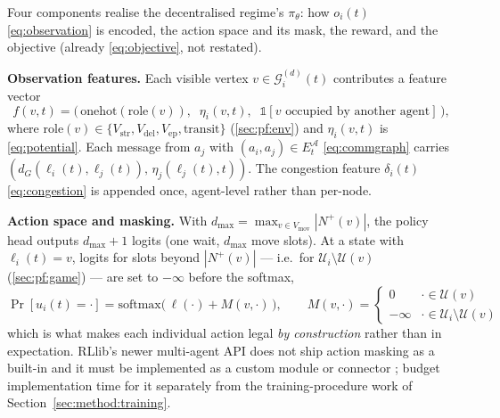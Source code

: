 \documentclass[../main.tex]{subfiles}
\begin{document}
Four components realise the decentralised regime's $\pi_\theta$: how
$o_i(t)$ \eqref{eq:observation} is encoded, the action space and its mask,
the reward, and the objective (already \eqref{eq:objective}, not restated).

\textbf{Observation features.} Each visible vertex $v \in
\mathcal{G}_i^{(d)}(t)$ contributes a feature vector
\begin{equation}
  f(v,t) = \bigl(\, \mathrm{onehot}(\mathrm{role}(v)),\;\; \eta_i(v,t),\;\;
                    \mathbb{1}[v \text{ occupied by another agent}] \,\bigr) ,
  \label{eq:features}
\end{equation}
where $\mathrm{role}(v) \in \{V_{\mathrm{str}}, V_{\mathrm{del}}, V_{\mathrm{ep}},
\text{transit}\}$ (\ref{sec:pf:env}) and $\eta_i(v,t)$ is
\eqref{eq:potential}. Each message from $a_j$ with $(a_i,a_j)\in
E^{\mathcal{A}}_t$ \eqref{eq:commgraph} carries $(d_G(\ell_i(t),\ell_j(t)),\,
\eta_j(\ell_j(t),t))$. The congestion feature $\delta_i(t)$
\eqref{eq:congestion} is appended once, agent-level rather than per-node.

\textbf{Action space and masking.} With $d_{\max} = \max_{v\in V_{\mathrm{mov}}}
|N^{+}(v)|$, the policy head outputs $d_{\max}+1$ logits (one wait, $d_{\max}$
move slots). At a state with $\ell_i(t)=v$, logits for slots beyond
$|N^{+}(v)|$ --- i.e.\ for $\mathcal{U}_i \setminus \mathcal{U}(v)$
(\ref{sec:pf:game}) --- are set to $-\infty$ before the softmax,
\begin{equation}
  \Pr[u_i(t) = \cdot] = \mathrm{softmax}\bigl(\, \ell(\cdot) + M(v,\cdot) \,\bigr),
  \qquad M(v,\cdot) = \begin{cases} 0 & \cdot \in \mathcal{U}(v) \\
                                     -\infty & \cdot \in \mathcal{U}_i\setminus\mathcal{U}(v) \end{cases}
  \label{eq:mask}
\end{equation}
which is what makes each individual action legal \emph{by construction}
rather than in expectation. RLlib's newer multi-agent API does not ship
action masking as a built-in and it must be implemented as a custom module or
connector \citep{rllibmultiagent}; budget implementation time for it
separately from the training-procedure work of
Section~\ref{sec:method:training}.
\end{document}
